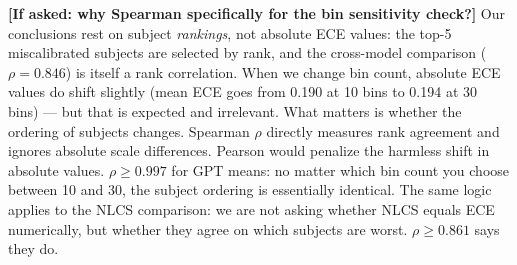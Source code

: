 \documentclass[aspectratio=169,11pt]{beamer}
\begin{document}
{  \textbf{[If asked: why Spearman specifically for the bin sensitivity check?]}
  Our conclusions rest on subject \emph{rankings}, not absolute ECE values:
  the top-5 miscalibrated subjects are selected by rank, and the cross-model
  comparison ($\rho = 0.846$) is itself a rank correlation. When we change bin
  count, absolute ECE values do shift slightly (mean ECE goes from 0.190 at
  10 bins to 0.194 at 30 bins) --- but that is expected and irrelevant.
  What matters is whether the ordering of subjects changes.
  Spearman $\rho$ directly measures rank agreement and ignores absolute scale
  differences. Pearson would penalize the harmless shift in absolute values.
  $\rho \geq 0.997$ for GPT means: no matter which bin count you choose between
  10 and 30, the subject ordering is essentially identical.
  The same logic applies to the NLCS comparison: we are not asking whether NLCS
  equals ECE numerically, but whether they agree on which subjects are worst.
  $\rho \geq 0.861$ says they do.
}

\end{document}
